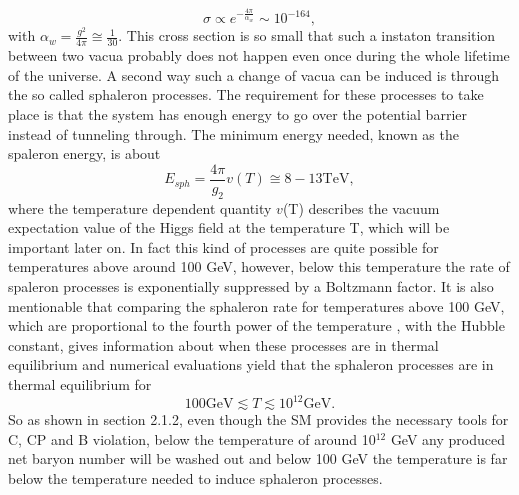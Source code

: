 \begin{equation}
	\sigma\propto e^{-\frac{4\pi}{\alpha_w}}\sim10^{-164},
	\label{eq:instaton_cross_section}
\end{equation}
with $\alpha_w=\frac{g^2}{4\pi}\cong\frac{1}{30}$.
This cross section is so small that such a instaton transition between two vacua probably does not happen even once during the whole lifetime of the universe. \newline\indent
A second way such a change of vacua can be induced is through the so called sphaleron processes. The requirement for these processes to take place is that the system has enough energy to go over the potential barrier instead of tunneling through. The minimum energy needed, known as the spaleron energy, is about\cite{Bernreuther:2002uj,Cline:2006ts}
\begin{equation}
	E_{sph}=\frac{4\pi}{g_2}v(T)\cong8-13\text{TeV},
	\label{eq:spaleron}
\end{equation} 
where the temperature dependent quantity $v$(T) describes the vacuum expectation value of the Higgs field at the temperature T, which will be important later on.\newline\indent
In fact this kind of processes are quite possible for temperatures above around 100 GeV, however, below this temperature the rate of spaleron processes is exponentially suppressed by a Boltzmann factor. It is also mentionable that comparing the sphaleron rate for temperatures above 100 GeV, which are proportional to the fourth power of the temperature \cite[p. 19]{Bernreuther:2002uj}, with the Hubble constant, gives information about when these processes are in thermal equilibrium and numerical evaluations yield that the sphaleron processes are in thermal equilibrium for
\begin{equation*}
100\text{GeV}\lesssim T \lesssim 10^{12}\text{GeV}.
\end{equation*}
So as shown in section 2.1.2, even though the SM provides the necessary tools for C, CP and B violation, below the temperature of around 10$^{12}$ GeV any produced net baryon number will be washed out and below 100 GeV the temperature is far below the temperature needed to induce sphaleron processes. \newline\indent
